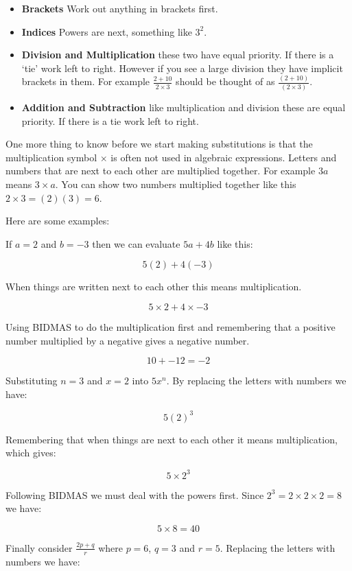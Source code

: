 \documentclass[
  a4paper,
]{scrbook}
\providecommand{\tightlist}{%
  \setlength{\itemsep}{0pt}\setlength{\parskip}{0pt}}\usepackage{longtable,booktabs,array}
\begin{document}
\begin{itemize}
\tightlist
\item
  \textbf{Brackets} Work out anything in brackets first.
\item
  \textbf{Indices} Powers are next, something like \(3^2\).
\item
  \textbf{Division and Multiplication} these two have equal priority. If
  there is a `tie' work left to right. However if you see a large
  division they have implicit brackets in them. For example
  \(\frac{2 + 10}{2 \times 3}\) should be thought of as
  \(\frac{(2 + 10)}{(2 \times 3)}\).
\item
  \textbf{Addition and Subtraction} like multiplication and division
  these are equal priority. If there is a tie work left to right.
\end{itemize}

One more thing to know before we start making substitutions is that the
multiplication symbol \(\times\) is often not used in algebraic
expressions. Letters and numbers that are next to each other are
multiplied together. For example \(3a\) means \(3 \times a\). You can
show two numbers multiplied together like this
\(2 \times 3 = (2)(3) = 6\).

Here are some examples:

If \(a=2\) and \(b=-3\) then we can evaluate \(5a + 4b\) like this:

\[
5(2) + 4(-3)
\]

When things are written next to each other this means multiplication.

\[
5\times 2 + 4 \times -3
\]

Using BIDMAS to do the multiplication first and remembering that a
positive number multiplied by a negative gives a negative number.

\[
10 +- 12 = -2
\]

Substituting \(n = 3\) and \(x = 2\) into \(5x^n\). By replacing the
letters with numbers we have:

\[
5(2)^3
\]

Remembering that when things are next to each other it means
multiplication, which gives:

\[
5 \times 2^3
\]

Following BIDMAS we must deal with the powers first. Since
\(2^3 = 2 \times 2 \times 2 = 8\) we have:

\[
5 \times 8 = 40
\]

Finally consider \(\frac{2p+q}{r}\) where \(p=6\), \(q=3\) and \(r=5\).
Replacing the letters with numbers we have:
\end{document}
